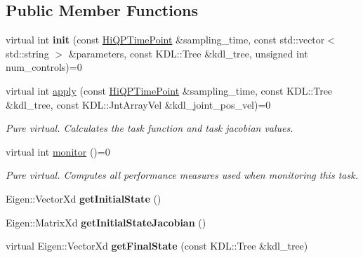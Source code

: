 \subsection*{Public Member Functions}
\begin{DoxyCompactItemize}
\item 
\hypertarget{classhiqp_1_1TaskFunction_a74b27f9f666988edb072fb8b6a790da3}{virtual int {\bfseries init} (const \hyperlink{classhiqp_1_1HiQPTimePoint}{Hi\-Q\-P\-Time\-Point} \&sampling\-\_\-time, const std\-::vector$<$ std\-::string $>$ \&parameters, const K\-D\-L\-::\-Tree \&kdl\-\_\-tree, unsigned int num\-\_\-controls)=0}\label{classhiqp_1_1TaskFunction_a74b27f9f666988edb072fb8b6a790da3}

\item 
virtual int \hyperlink{classhiqp_1_1TaskFunction_a3c476e011c762b8a8f7470ec47f70a17}{apply} (const \hyperlink{classhiqp_1_1HiQPTimePoint}{Hi\-Q\-P\-Time\-Point} \&sampling\-\_\-time, const K\-D\-L\-::\-Tree \&kdl\-\_\-tree, const K\-D\-L\-::\-Jnt\-Array\-Vel \&kdl\-\_\-joint\-\_\-pos\-\_\-vel)=0
\begin{DoxyCompactList}\small\item\em {\itshape Pure virtual}. Calculates the task function and task jacobian values. \end{DoxyCompactList}\item 
virtual int \hyperlink{classhiqp_1_1TaskFunction_a47a3283a0c0ebafa17feeca96afe5af0}{monitor} ()=0
\begin{DoxyCompactList}\small\item\em {\itshape Pure virtual}. Computes all performance measures used when monitoring this task. \end{DoxyCompactList}\item 
\hypertarget{classhiqp_1_1TaskFunction_a43f0634f321270ff9922985bc51992c0}{Eigen\-::\-Vector\-Xd {\bfseries get\-Initial\-State} ()}\label{classhiqp_1_1TaskFunction_a43f0634f321270ff9922985bc51992c0}

\item 
\hypertarget{classhiqp_1_1TaskFunction_a1450beadd7300ae786ff8c2756c94643}{Eigen\-::\-Matrix\-Xd {\bfseries get\-Initial\-State\-Jacobian} ()}\label{classhiqp_1_1TaskFunction_a1450beadd7300ae786ff8c2756c94643}

\item 
\hypertarget{classhiqp_1_1TaskFunction_a3869d4b73495e31ef63941b9cb95e55f}{virtual Eigen\-::\-Vector\-Xd {\bfseries get\-Final\-State} (const K\-D\-L\-::\-Tree \&kdl\-\_\-tree)}\label{classhiqp_1_1TaskFunction_a3869d4b73495e31ef63941b9cb95e55f}

\end{DoxyCompactItemize}
